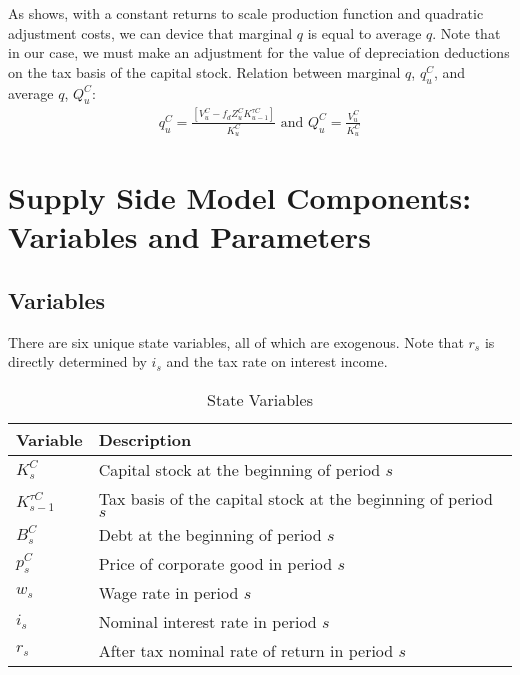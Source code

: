 As \citet{Hayashi1982} shows,  with a constant returns to scale production function and quadratic adjustment costs, we can device that marginal $q$ is equal to average $q$.  Note that in our case, we must make an adjustment for the value of depreciation deductions on the tax basis of the capital stock.  Relation between marginal $q$, $q^{C}_{u}$, and average $q$, $Q^{C}_{u}$:
 \begin{equation}
\label{eqn:avg_q}
\begin{split}
q^{C}_{u}=\frac{[V^{C}_{u}-f_{d}Z^{C}_{u}K^{\tau C}_{u-1}]}{K^{C}_{u}} \text{ and } Q^{C}_{u}=\frac{V^{C}_{u}}{K^{C}_{u}}
\end{split}
\end{equation}



 \section{Supply Side Model Components: Variables and Parameters}
\label{sec:components}


\subsection{Variables}

There are six unique state variables, all of which are exogenous.  Note that $r_{s}$ is directly determined by $i_{s}$ and the tax rate on interest income.

\begin{table}[htbp]
  \centering
  \caption{State Variables}
    \begin{tabular}{ll}
    \hline
    \hline
    Variable & Description \\
    \hline
    $K^{C}_{s}$ & Capital stock at the beginning of period $s$ \\
    $K^{\tau C}_{s-1}$ & Tax basis of the capital stock at the beginning of period $s$\\
    $B^{C}_{s}$ & Debt at the beginning of period $s$ \\
    $p^{C}_{s}$ & Price of corporate good in period $s$ \\
    $w_{s}$ & Wage rate in period $s$ \\
    $i_{s}$ & Nominal interest rate in period $s$ \\
    $r_{s}$ & After tax nominal rate of return in period $s$ \\
    \hline
    \hline
    \end{tabular}%
  \label{tab:state_vars}%
\end{table}%

